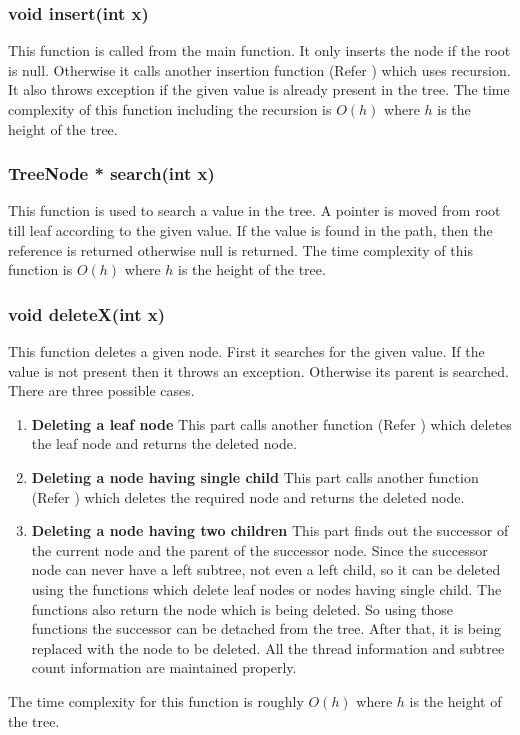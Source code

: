 \documentclass{article}
\begin{document}
\subsubsection{void insert(int x)}
This function is called from the main function. It only inserts the node if the root is null. Otherwise it calls another insertion function (Refer ) which uses recursion. It also throws exception if the given value is already present in the tree. The time complexity of this function including the recursion is $O(h)$ where $h$ is the height of the tree.
\subsubsection{TreeNode * search(int x)}
This function is used to search a value in the tree. A pointer is moved from root till leaf according to the given value. If the value is found in the path, then the reference is returned otherwise null is returned. The time complexity of this function is $O(h)$ where $h$ is the height of the tree.
\subsubsection{void deleteX(int x)}
This function deletes a given node. First it searches for the given value. If the value is not present then it throws an exception. Otherwise its parent is searched. There are three possible cases.
\begin{enumerate}
	\item \textbf{Deleting a leaf node}\newline
	This part calls another function (Refer ) which deletes the leaf node and returns the deleted node.
	\item \textbf{Deleting a node having single child}\newline
	This part calls another function (Refer ) which deletes the required node and returns the deleted node.
	\item \textbf{Deleting a node having two children}\newline
	This part finds out the successor of the current node and the parent of the successor node. Since the successor node can never have a left subtree, not even a left child, so it can be deleted using the functions which delete leaf nodes or nodes having single child. The functions also return the node which is being deleted. So using those functions the successor can be detached from the tree. After that, it is being replaced with the node to be deleted. All the thread information and subtree count information are maintained properly.  
\end{enumerate}
The time complexity for this function is roughly $O(h)$ where $h$ is the height of the tree.
\end{document}
